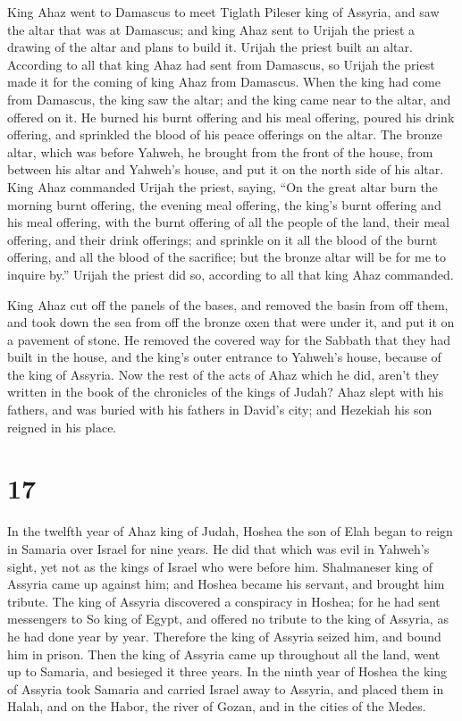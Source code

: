 King Ahaz went to Damascus to meet Tiglath Pileser king of
Assyria, and saw the altar that was at Damascus; and king Ahaz sent to
Urijah the priest a drawing of the altar and plans to build it.
 Urijah the priest built an altar. According to all that
king Ahaz had sent from Damascus, so Urijah the priest made it for the
coming of king Ahaz from Damascus.  When the king had come
from Damascus, the king saw the altar; and the king came near to the
altar, and offered on it.  He burned his burnt offering and
his meal offering, poured his drink offering, and sprinkled the blood of
his peace offerings on the altar.  The bronze altar, which
was before Yahweh, he brought from the front of the house, from between
his altar and Yahweh's house, and put it on the north side of his altar.
 King Ahaz commanded Urijah the priest, saying, ``On the
great altar burn the morning burnt offering, the evening meal offering,
the king's burnt offering and his meal offering, with the burnt offering
of all the people of the land, their meal offering, and their drink
offerings; and sprinkle on it all the blood of the burnt offering, and
all the blood of the sacrifice; but the bronze altar will be for me to
inquire by.''  Urijah the priest did so, according to all
that king Ahaz commanded.

 King Ahaz cut off the panels of the bases, and removed the
basin from off them, and took down the sea from off the bronze oxen that
were under it, and put it on a pavement of stone.  He
removed the covered way for the Sabbath that they had built in the
house, and the king's outer entrance to Yahweh's house, because of the
king of Assyria.  Now the rest of the acts of Ahaz which he
did, aren't they written in the book of the chronicles of the kings of
Judah?  Ahaz slept with his fathers, and was buried with
his fathers in David's city; and Hezekiah his son reigned in his place.

\hypertarget{section-16}{%
\section{17}\label{section-16}}

 In the twelfth year of Ahaz king of Judah, Hoshea the son
of Elah began to reign in Samaria over Israel for nine years.
 He did that which was evil in Yahweh's sight, yet not as
the kings of Israel who were before him.  Shalmaneser king
of Assyria came up against him; and Hoshea became his servant, and
brought him tribute.  The king of Assyria discovered a
conspiracy in Hoshea; for he had sent messengers to So king of Egypt,
and offered no tribute to the king of Assyria, as he had done year by
year. Therefore the king of Assyria seized him, and bound him in prison.
 Then the king of Assyria came up throughout all the land,
went up to Samaria, and besieged it three years.  In the
ninth year of Hoshea the king of Assyria took Samaria and carried Israel
away to Assyria, and placed them in Halah, and on the Habor, the river
of Gozan, and in the cities of the Medes.

